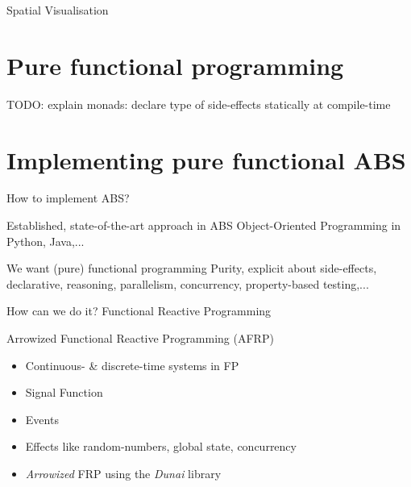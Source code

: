 \documentclass{beamer}
\begin{document}
\begin{frame}{Spatial Visualisation}
\end{frame}

\section{Pure functional programming}
TODO: explain monads: declare type of side-effects statically at compile-time

\section{Implementing pure functional ABS}
\begin{frame}{How to implement ABS?}
  \begin{block}{Established, state-of-the-art approach in ABS}
	Object-Oriented Programming in Python, Java,...
  \end{block}
  
  \begin{block}{We want (pure) functional programming}
	Purity, explicit about side-effects, declarative, reasoning, parallelism, concurrency, property-based testing,...
  \end{block}
  
  \begin{block}{How can we do it?}
  	Functional Reactive Programming
  \end{block}
\end{frame}

\begin{frame}{Arrowized Functional Reactive Programming (AFRP)}
  \begin{itemize}
    \item Continuous- \& discrete-time systems in FP
 	\item Signal Function 
 	\item Events
 	\item Effects like random-numbers, global state, concurrency
 	\item \textit{Arrowized} FRP using the \textit{Dunai} library
  \end{itemize}
\end{frame}
\end{document}
